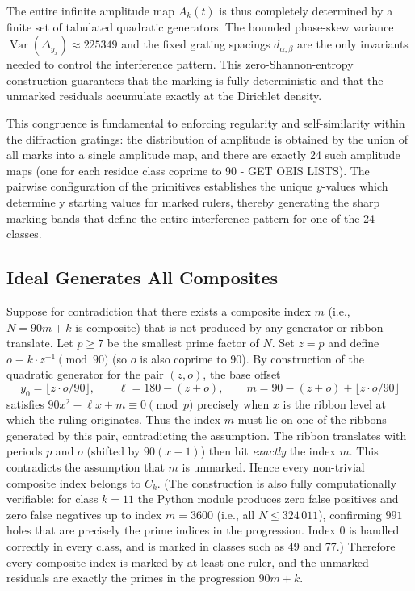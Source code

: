 \documentclass[11pt,a4paper]{article}
\begin{document}
The entire infinite amplitude map \(A_k(t)\) is thus completely determined by a finite set of tabulated quadratic generators. The bounded phase-skew variance \(\operatorname{Var}(\Delta_{y_x})\approx225349\) and the fixed grating spacings \(d_{\alpha,\beta}\) are the only invariants needed to control the interference pattern. This zero-Shannon-entropy construction guarantees that the marking is fully deterministic and that the unmarked residuals accumulate exactly at the Dirichlet density.

This congruence is fundamental to enforcing regularity and self-similarity within the diffraction gratings: the distribution of amplitude is obtained by the union of all marks into a single amplitude map, and there are exactly 24 such amplitude maps (one for each residue class coprime to 90 - GET OEIS LISTS). The pairwise configuration of the primitives establishes the unique \(y\)-values which determine y starting values for marked rulers, thereby generating the sharp marking bands that define the entire interference pattern for one of the 24 classes.
\subsection{Ideal Generates All Composites}
Suppose for contradiction that there exists a composite index \(m\) (i.e., \(N=90m+k\) is composite) that is not produced by any generator or ribbon translate. Let \(p\geq7\) be the smallest prime factor of \(N\). Set \(z=p\) and define \(o\equiv k\cdot z^{-1}\pmod{90}\) (so \(o\) is also coprime to 90). By construction of the quadratic generator for the pair \((z,o)\), the base offset
\[
y_0=\lfloor z\cdot o/90\rfloor,\qquad \ell=180-(z+o),\qquad m=90-(z+o)+\lfloor z\cdot o/90\rfloor
\]
satisfies \(90x^2-\ell x+m\equiv0\pmod{p}\) precisely when \(x\) is the ribbon level at which the ruling originates. Thus the index \(m\) must lie on one of the ribbons generated by this pair, contradicting the assumption. The ribbon translates with periods $p$ and $o$ (shifted by $90(x-1)$) then hit \emph{exactly} the index $m$. This contradicts the assumption that $m$ is unmarked. Hence every non-trivial composite index belongs to $C_k$. (The construction is also fully computationally verifiable: for class $k=11$ the Python module produces zero false positives and zero false negatives up to index $m=3600$ (i.e., all $N\leq324\,011$), confirming $991$ holes that are precisely the prime indices in the progression. Index $0$ is handled correctly in every class, and is marked in classes such as 49 and 77.) Therefore every composite index is marked by at least one ruler, and the unmarked residuals are exactly the primes in the progression \(90m+k\).
\end{document}
